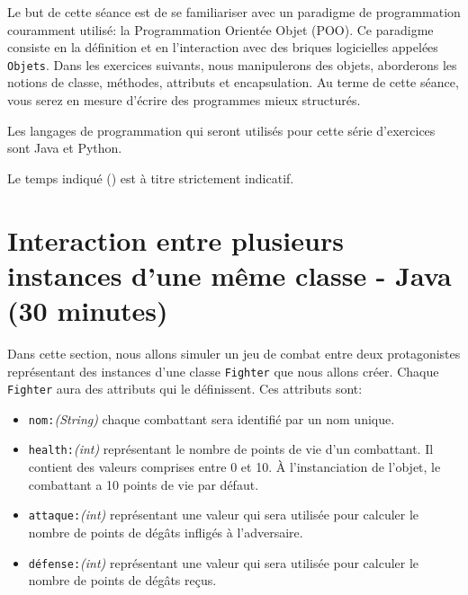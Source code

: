 




\ShowSolutiontrue
\ShowConseiltrue
\titre
{}

Le but de cette séance est de se familiariser avec un paradigme de programmation couramment utilisé: la Programmation Orientée Objet (POO). Ce paradigme consiste en la définition et en l'interaction avec des briques logicielles appelées \lstinline{Objets}. Dans les exercices suivants, nous manipulerons des objets, aborderons les notions de classe, méthodes, attributs et encapsulation. Au terme de cette séance, vous serez en mesure d'écrire des programmes mieux structurés.

Les langages de programmation qui seront utilisés pour cette série d'exercices sont Java et Python.

Le temps indiqué (\faClock) est à titre strictement indicatif.

\section{Interaction entre plusieurs instances d'une même classe - Java (30 minutes)}

Dans cette section, nous allons simuler un jeu de combat entre deux protagonistes représentant des instances d'une classe \lstinline{Fighter} que nous allons créer.
Chaque \lstinline{Fighter} aura des attributs qui le définissent. Ces attributs sont:

\begin{itemize}
    \item \lstinline{nom:}\textit{(String)} chaque combattant sera identifié par un nom unique.
    \item \lstinline{health:}\textit{(int)} représentant le nombre de points de vie d'un combattant. Il contient des valeurs comprises entre 0 et 10. À l'instanciation de l'objet, le combattant a 10 points de vie par défaut.
    \item \lstinline{attaque:}\textit{(int)} représentant une valeur qui sera utilisée pour calculer le nombre de points de dégâts infligés à l'adversaire.
    \item \lstinline{défense:}\textit{(int)} représentant une valeur qui sera utilisée pour calculer le nombre de points de dégâts reçus.\\
\end{itemize}

